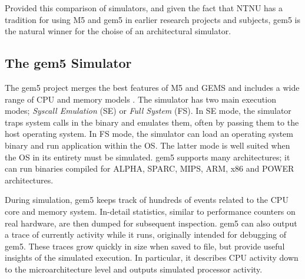 Provided this comparison of simulators, and given the fact that NTNU has a tradition
for using M5 and gem5 in earlier research projects and subjects, gem5 is the natural
winner for the choise of an architectural simulator.


\subsection{The gem5 Simulator}

The gem5 project \cite{gem5} merges the best features of M5 \cite{binkert2006m5}
and GEMS \cite{GEMS} and includes a wide range of CPU and memory models
\cite{gem5hipeac}. The simulator has two main execution modes; \textit{Syscall
Emulation} (SE) or \textit{Full System} (FS). In SE mode, the simulator traps
system calls in the binary and emulates them, often by passing them to the host
operating system. In FS mode, the simulator can load an operating system binary
and run application within the OS. The latter mode is well suited when the OS in
its entirety must be simulated. gem5 supports many architectures; it can run
binaries compiled for ALPHA, SPARC, MIPS, ARM, x86 and POWER architectures.

During simulation, gem5 keeps track of hundreds of events related to the CPU
core and memory system. In-detail statistics, similar to performance counters on
real hardware, are then dumped for subsequent inspection. gem5 can also output a
trace of currently activity while it runs, originally intended for debugging of
gem5. These traces grow quickly in size when saved to file, but provide useful
insights of the simulated execution. In particular, it describes CPU activity
down to the microarchitecture level and outputs simulated processor activity.

